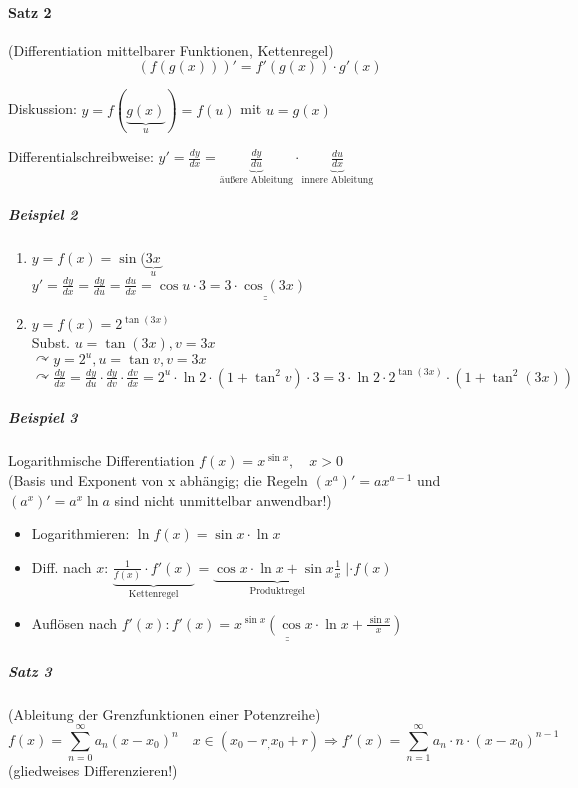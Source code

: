 \documentclass[a4paper]{scrartcl}
\begin{document}
\paragraph{Satz 2} (Differentiation mittelbarer Funktionen, Kettenregel)
\[(f(g(x)))' = f'(g(x)) \cdot g'(x)\]

Diskussion: $y=f(\underbrace{g(x)}_{u}) =f(u)$ mit $u=g(x)$

Differentialschreibweise: $y'=\frac{dy}{dx} = \underbrace{\frac{dy}{du}}_{\text{äußere Ableitung}} \cdot \underbrace{\frac{du}{dx}}_{\text{innere Ableitung}}$

\subparagraph{Beispiel 2}
\begin{enumerate}
\item $y=f(x) = \sin{(\underbrace{3x}_{u}}$\\
$y'=\frac{dy}{dx} = \frac{dy}{du}=\frac{du}{dx} = \cos{u} \cdot 3 = \underline{\underline{ 3 \cdot \cos{(3x)}}}$
\item $y=f(x)=2^{\tan{(3x)}}$\\
Subst. $u= \tan{(3x)}, v=3x$\\
$\curvearrowright y= 2^u, u = \tan{v}, v=3x$\\
$\curvearrowright \frac{dy}{dx} = \frac{dy}{du} \cdot \frac{dy}{dv} \cdot \frac{dv}{dx} = 2^u \cdot \ln{2} \cdot (1+ \tan^2{v}) \cdot 3 = 3 \cdot \ln{2} \cdot 2^{\tan{(3x)}} \cdot (1+\tan^2{(3x)})$
\end{enumerate}

\subparagraph{Beispiel 3} Logarithmische Differentiation
$f(x) = x^{\sin{x}}, \quad x>0$\\
(Basis und Exponent von x abhängig; die Regeln $(x^a)' = ax^{a-1}$ und $(a^x)' = a^x \ln{a}$ sind nicht unmittelbar anwendbar!)
\begin{itemize}
\item Logarithmieren: $\ln{f(x)} = \sin{x} \cdot \ln{x}$
\item Diff. nach $x$: $\underbrace{\frac{1}{f(x)} \cdot f'(x)}_{\text{Kettenregel}} = \underbrace{\cos{x} \cdot \ln{x} + \sin{x} \frac{1}{x}}_{\text{Produktregel}} \; | \cdot f(x)$
\item Auflösen nach $f'(x): \underline{\underline{f'(x) = x^{\sin{x}} ( \cos{x} \cdot \ln{x} + \frac{\sin{x}}{x})}}$
\end{itemize}

\subparagraph{Satz 3} (Ableitung der Grenzfunktionen einer Potenzreihe)
\[f(x) = \sum\limits_{n=0}^{\infty} a_n(x-x_0)^n \quad x\in (x_0 - r_,x_0 +r) \Rightarrow f'(x) = \sum\limits_{n=1}^{\infty} a_n \cdot n \cdot (x-x_0)^{n-1}\]
(gliedweises Differenzieren!)
\end{document}

